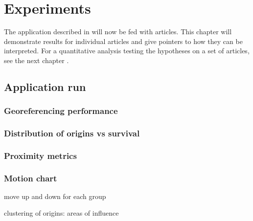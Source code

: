 \chapter{Experiments}\label{ch:experiment}

The application described in  will now be fed with articles. 
This chapter will demonstrate results for individual articles and give pointers to how they can be interpreted.
For a quantitative analysis testing the hypotheses on a set of articles, see the next chapter .

\section{Application run}



\subsection{Georeferencing performance}



\subsection{Distribution of origins vs survival}


\subsection{Proximity metrics}


\subsection{Motion chart}

\begin{todos}
   \item move up and down for each group
    \item clustering of origins: areas of influence
\end{todos}